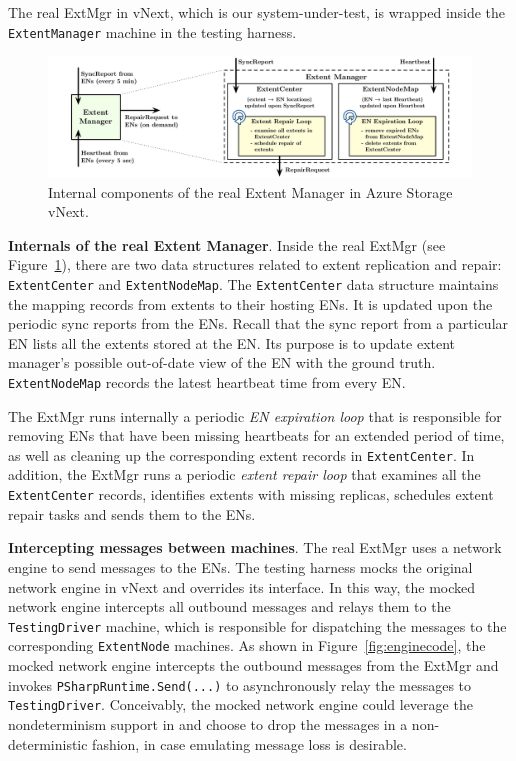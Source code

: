 The real ExtMgr in vNext, which is our system-under-test, is wrapped inside the \texttt{ExtentManager} \psharp machine in the testing harness.

\begin{figure}[t]
\centering
\includegraphics[width=.9\linewidth]{img/extent_manager}
\caption{Internal components of the real Extent Manager in Azure Storage vNext.}
\label{fig:extentmanager}
\end{figure}

\textbf{Internals of the real Extent Manager}.
Inside the real ExtMgr (see Figure~\ref{fig:extentmanager}), there are two data structures related to extent replication and repair: \texttt{ExtentCenter} and \texttt{ExtentNodeMap}. The \texttt{ExtentCenter} data structure maintains the mapping records from extents to their hosting ENs. It is updated upon the periodic sync reports from the ENs. Recall that the sync report from a particular EN lists all the extents stored at the EN. Its purpose is to update extent manager's possible out-of-date view of the EN with the ground truth. \texttt{ExtentNodeMap} records the latest heartbeat time from every EN.

The ExtMgr runs internally a periodic \emph{EN expiration loop} that is responsible for removing ENs that have been missing heartbeats for an extended period of time, as well as cleaning up the corresponding extent records in \texttt{ExtentCenter}. In addition, the ExtMgr runs a periodic \emph{extent repair loop} that examines all the \texttt{ExtentCenter} records, identifies extents with missing replicas, schedules extent repair tasks and sends them to the ENs.

\textbf{Intercepting messages between machines}.
The real ExtMgr uses a network engine to send messages to the ENs. The testing harness mocks the original network engine in vNext and overrides its interface. In this way, the mocked network engine intercepts all outbound messages and relays them to the \texttt{TestingDriver} machine, which is responsible for dispatching the messages to the corresponding \texttt{ExtentNode} machines. As shown in Figure~\ref{fig:enginecode}, the mocked network engine intercepts the outbound messages from the ExtMgr and invokes \texttt{PSharpRuntime.Send(...)} to asynchronously relay the messages to \texttt{TestingDriver}. Conceivably, the mocked network engine could leverage the nondeterminism support in \psharp and choose to drop the messages in a non-deterministic fashion, in case emulating message loss is desirable.

